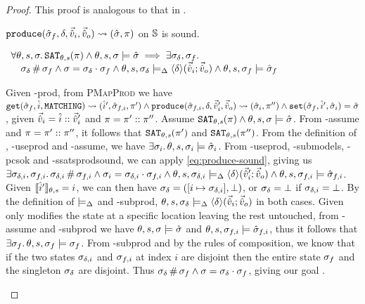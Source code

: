 \begin{proof}
This proof is analogous to that in \PMap.


\pfassume \begin{hypvlist}
 $\texttt{produce}(\hat{\sigma}_f,\delta,\vec{\hat{v}}_i,\vec{\hat{v}}_o)\rightsquigarrow (\hat{\sigma}, \pi)$
 \produce{} on $\mathbb S$ is sound.
\end{hypvlist}
\pfprove \begin{goalvlist}
 $\begin{array}{l}
\forall\theta,s,\sigma\ldotp \texttt{SAT}_{\mathit{\theta,s}}(\pi) \land \theta,s,\sigma\models\hat{\sigma} \implies \exists \sigma_\delta, \sigma_f\ldotp \\
\quad \sigma_\delta\operatorname{\#}\sigma_f \land \sigma=\sigma_\delta\cdot\sigma_f \land \theta,s,\sigma_\delta \models_{\Delta} \left<\delta\right>\!(\vec{\hat{v}}_i;\vec{\hat{v}}_o) \land \theta,s,\sigma_f \models \hat{\sigma}_f
\end{array}$
\end{goalvlist}

\begin{hypvlist}
 Given \hyp{prod}, from \textsc{PMapProd} we have $\texttt{get}(\hat{\sigma}_f,\hat{i},\texttt{MATCHING})\rightsquigarrow(\hat{i}',\hat{\sigma}_{f,i},\pi') \land \\\texttt{produce}(\hat{\sigma}_{f,i},\delta,\vec{\hat{v}}_i',\vec{\hat{v}}_o)\rightsquigarrow (\hat{\sigma}_i,\pi'') \land \texttt{set}(\hat{\sigma}_f,\hat{i}',\hat{\sigma}_i)=\hat{\sigma}$, given $\vec{\hat{v}}_i=\hat{i}::\vec{\hat{v}}_i'$ and ${\pi=\pi'::\pi''}$.%
 Assume $\texttt{SAT}_{\mathit{\theta,s}}(\pi) \land \theta,s,\sigma\models\hat{\sigma}$.
 From \hyp{assume} and $\pi=\pi'::\pi''$, it follows that $\texttt{SAT}_{\mathit{\theta,s}}(\pi')$ and $\texttt{SAT}_{\mathit{\theta,s}}(\pi'')$.
 From the definition of , \hyp{useprod} and \hyp{assume}, we have $\exists \sigma_i\ldotp \theta,s,\sigma_i\models \hat{\sigma}_i$.
 From \hyp{useprod}, \hyp{submodels}, \hyp{pcsok} and \hyp{ssatsprodsound}, we can apply \ref{eq:produce-sound}, giving us $\exists \sigma_{\delta,i}, \sigma_{f,i}\ldotp \sigma_{\delta,i}\operatorname{\#}\sigma_{f,i} \land \sigma_i=\sigma_{\delta,i}\cdot\sigma_{f,i} \land \theta,s,\sigma_{\delta,i}\models_{\Delta} \left<\delta\right>\!(\vec{\hat{v}}_i';\vec{\hat{v}}_o) \land \theta,s,\sigma_{f,i}\models\hat{\sigma}_{f,i}$.
 Given $\llbracket\hat{i}'\rrbracket_{\theta,s}=i$, we can then have $\sigma_\delta=([i\mapsto \sigma_{\delta,i}], \bot)$, or $\sigma_\delta=\bot$ if $\sigma_{\delta,i}=\bot$. By the definition of $\models_{\Delta}$ and \hyp{subprod}, $\theta,s,\sigma_\delta\models_{\Delta}\left<\delta\right>\!(\vec{\hat{v}}_i;\vec{\hat{v}}_o)$ in both cases.
 Given  only modifies the state at a specific location leaving the rest untouched, from \hyp{assume} and \hyp{subprod} we have $\theta,s,\sigma\models\hat{\sigma}$ and $\theta,s,\sigma_{f,i}\models\hat{\sigma}_{f,i}$, thus it follows that $\exists \sigma_f\ldotp \theta,s,\sigma_f\models\sigma_f$.
 From \hyp{subprod} and by the rules of composition, we know that if the two states $\sigma_{\delta,i}$ and $\sigma_{f,i}$ at index $i$ are disjoint then the entire state $\sigma_f$ and the singleton $\sigma_\delta$ are disjoint. Thus $\sigma_\delta\operatorname{\#}\sigma_f\land\sigma=\sigma_\delta\cdot\sigma_f$, giving our goal .
\end{hypvlist}


\end{proof}
